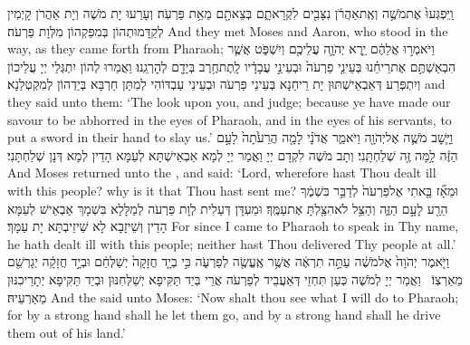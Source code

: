 {וַֽיִּפְגְּעוּ֙ אֶת\maqqaf מֹשֶׁ֣ה וְאֶֽת\maqqaf אַהֲרֹ֔ן נִצָּבִ֖ים לִקְרָאתָ֑ם בְּצֵאתָ֖ם מֵאֵ֥ת פַּרְעֹֽה׃}
{וְעָרַעוּ יָת מֹשֶׁה וְיָת אַהֲרֹן קָיְמִין לְקַדָּמוּתְהוֹן בְּמִפַּקְהוֹן מִלְּוָת פַּרְעֹה׃}
{And they met Moses and Aaron, who stood in the way, as they came forth from Pharaoh;}{}
{וַיֹּאמְר֣וּ אֲלֵהֶ֔ם יֵ֧רֶא יְהֹוָ֛ה עֲלֵיכֶ֖ם וְיִשְׁפֹּ֑ט אֲשֶׁ֧ר הִבְאַשְׁתֶּ֣ם אֶת\maqqaf רֵיחֵ֗נוּ בְּעֵינֵ֤י פַרְעֹה֙ וּבְעֵינֵ֣י עֲבָדָ֔יו לָֽתֶת\maqqaf חֶ֥רֶב בְּיָדָ֖ם לְהׇרְגֵֽנוּ׃}
{וַאֲמַרוּ לְהוֹן יִתְגְּלֵי יְיָ עֲלֵיכוֹן וְיִתְפְּרַע דְּאַבְאֵישְׁתּוּן יָת רֵיחַנָא בְּעֵינֵי פַּרְעֹה וּבְעֵינֵי עַבְדּוֹהִי לְמִתַּן חַרְבָּא בְּיַדְהוֹן לְמִקְטְלַנָא׃}
{and they said unto them: ‘The \lord\space look upon you, and judge; because ye have made our savour to be abhorred in the eyes of Pharaoh, and in the eyes of his servants, to put a sword in their hand to slay us.’}{}
{וַיָּ֧שׇׁב מֹשֶׁ֛ה אֶל\maqqaf יְהֹוָ֖ה וַיֹּאמַ֑ר אֲדֹנָ֗י לָמָ֤ה הֲרֵעֹ֙תָה֙ לָעָ֣ם הַזֶּ֔ה לָ֥מָּה זֶּ֖ה שְׁלַחְתָּֽנִי׃}
{וְתָב מֹשֶׁה לִקְדָם יְיָ וַאֲמַר יְיָ לְמָא אַבְאֵישְׁתָּא לְעַמָּא הָדֵין לְמָא דְּנָן שְׁלַחְתָּנִי׃}
{And Moses returned unto the \lord, and said: ‘Lord, wherefore hast Thou dealt ill with this people? why is it that Thou hast sent me?}{}
{וּמֵאָ֞ז בָּ֤אתִי אֶל\maqqaf פַּרְעֹה֙ לְדַבֵּ֣ר בִּשְׁמֶ֔ךָ הֵרַ֖ע לָעָ֣ם הַזֶּ֑ה וְהַצֵּ֥ל לֹא\maqqaf הִצַּ֖לְתָּ אֶת\maqqaf עַמֶּֽךָ׃}
{וּמֵעִדָּן דְּעַלִית לְוָת פַּרְעֹה לְמַלָּלָא בִּשְׁמָךְ אַבְאֵישׁ לְעַמָּא הָדֵין וְשֵׁיזָבָא לָא שֵׁיזֵיבְתָּא יָת עַמָּךְ׃}
{For since I came to Pharaoh to speak in Thy name, he hath dealt ill with this people; neither hast Thou delivered Thy people at all.’}{}
\newperek
{}%
{וַיֹּ֤אמֶר יְהֹוָה֙ אֶל\maqqaf מֹשֶׁ֔ה עַתָּ֣ה תִרְאֶ֔ה אֲשֶׁ֥ר אֶֽעֱשֶׂ֖ה לְפַרְעֹ֑ה כִּ֣י בְיָ֤ד חֲזָקָה֙ יְשַׁלְּחֵ֔ם וּבְיָ֣ד חֲזָקָ֔ה יְגָרְשֵׁ֖ם מֵאַרְצֽוֹ׃ \setuma }
{וַאֲמַר יְיָ לְמֹשֶׁה כְּעַן תִּחְזֵי דְּאַעֲבֵיד לְפַרְעֹה אֲרֵי בְּיַד תַּקִּיפָא יְשַׁלְּחִנּוּן וּבְיַד תַּקִּיפָא יְתָרֵיכִנּוּן מֵאַרְעֵיהּ׃}
{And the \lord\space said unto Moses: ‘Now shalt thou see what I will do to Pharaoh; for by a strong hand shall he let them go, and by a strong hand shall he drive them out of his land.’}{}
